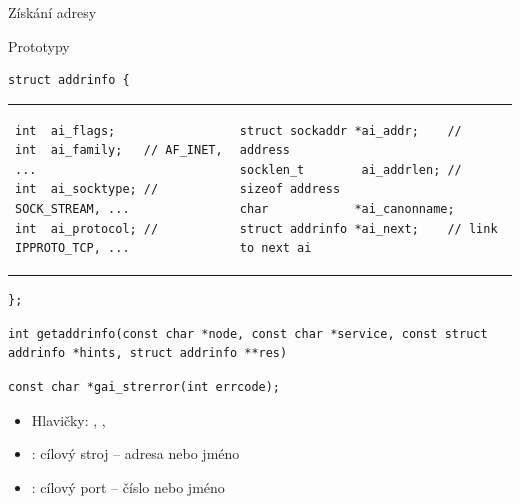 \begin{frame}[fragile]{Získání adresy}

  \begin{block}{Prototypy}


    \begin{lstlisting}[aboveskip=3pt,belowskip=0pt]
struct addrinfo {
    \end{lstlisting}
    \begin{tabular}{ll}
  \begin{lstlisting}[aboveskip=0pt,belowskip=0pt]
int  ai_flags;
int  ai_family;   // AF_INET, ...
int  ai_socktype; // SOCK_STREAM, ...
int  ai_protocol; // IPPROTO_TCP, ...
  \end{lstlisting} &
  \begin{lstlisting}[aboveskip=0pt,belowskip=0pt]
struct sockaddr *ai_addr;    // address
socklen_t        ai_addrlen; // sizeof address
char            *ai_canonname;
struct addrinfo *ai_next;    // link to next ai
  \end{lstlisting}
    \end{tabular}
    \begin{lstlisting}[aboveskip=0pt,belowskip=3pt]
};
    \end{lstlisting}


    \begin{lstlisting}[aboveskip=3pt,belowskip=0pt]
int getaddrinfo(const char *node, const char *service, const struct addrinfo *hints, struct addrinfo **res)
    \end{lstlisting}


    \begin{lstlisting}[aboveskip=0pt,belowskip=2pt]
const char *gai_strerror(int errcode);
    \end{lstlisting}
  \end{block}


  \begin{itemize}
    \item Hlavičky: , ,

    \pause

    \item {}: cílový stroj -- adresa nebo jméno
    \item {}: cílový port -- číslo nebo jméno


\end{itemize}
\end{frame}

